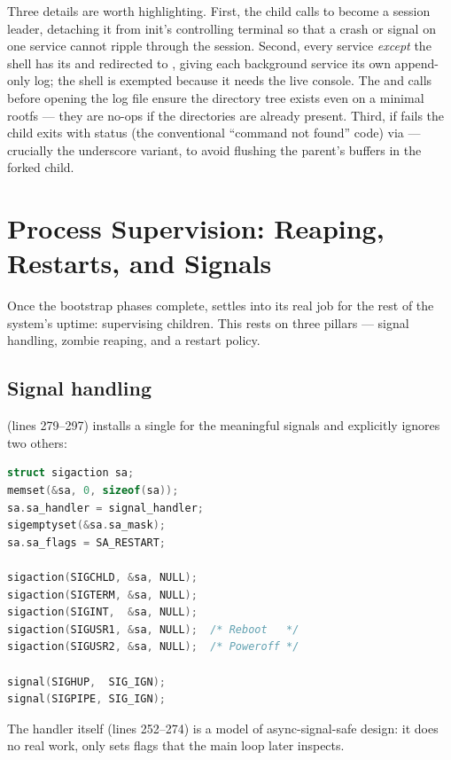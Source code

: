 Three details are worth highlighting. First, the child calls  to
become a session leader, detaching it from init's controlling terminal so that a
crash or signal on one service cannot ripple through the session. Second, every
service \emph{except} the shell has its  and 
redirected to , giving each background service its own
append-only log; the shell is exempted because it needs the live console. The
 and  calls before
opening the log file ensure the directory tree exists even on a minimal rootfs
--- they are no-ops if the directories are already present. Third, if
 fails the child exits with status  (the conventional
``command not found'' code) via  --- crucially the underscore
variant, to avoid flushing the parent's  buffers in the forked
child.

\section{Process Supervision: Reaping, Restarts, and Signals}

Once the bootstrap phases complete,  settles into its real job for
the rest of the system's uptime: supervising children. This rests on three
pillars --- signal handling, zombie reaping, and a restart policy.

\subsection{Signal handling}

 (lines 279--297) installs a single 
for the meaningful signals and explicitly ignores two others:

\begin{lstlisting}[language=C, caption={Signal disposition installed by setup\_signals()}]
struct sigaction sa;
memset(&sa, 0, sizeof(sa));
sa.sa_handler = signal_handler;
sigemptyset(&sa.sa_mask);
sa.sa_flags = SA_RESTART;

sigaction(SIGCHLD, &sa, NULL);
sigaction(SIGTERM, &sa, NULL);
sigaction(SIGINT,  &sa, NULL);
sigaction(SIGUSR1, &sa, NULL);  /* Reboot   */
sigaction(SIGUSR2, &sa, NULL);  /* Poweroff */

signal(SIGHUP,  SIG_IGN);
signal(SIGPIPE, SIG_IGN);
\end{lstlisting}

The handler itself (lines 252--274) is a model of async-signal-safe design: it
does no real work, only sets  flags that the main
loop later inspects.

